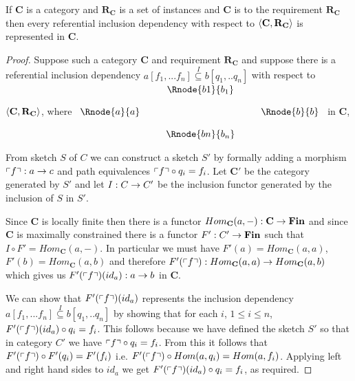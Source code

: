 \documentclass[10pt,a4paper]{article}
\theoremstyle{remark}
\newcommand{\catc}[1][C]{\textbf{#1}}
\newcommand{\catcp}[1][C]{\textbf{#1}'}
\newcommand{\reqt}{\textbf{R}}
\newcommand{\reqtc}[1][\catc]{\reqt_{#1}}
\newcommand{\Fin}{\ensuremath{\textbf{Fin}} }
\begin{document}
\begin{lemma}
\label{catincdsrepresented}
If $\catc$ is a  category and $\reqtc$ is a set of instances  and $\catc$ is 
 to the requirement $\reqtc$ then
every referential inclusion dependency with respect to $\tuple{\catc,\reqtc}$ is represented in $\catc$.
\end{lemma}
\begin{proof}
Suppose such  a category $\catc$ and  requirement $\reqtc$ 
 and suppose there is a referential inclusion dependency
$a[f_1,...f_n] \overset{I}{\subseteq} b[q_1,..q_n]$ with respect to $\tuple{\catc,\reqtc}$,
where
$
\begin{array}{c p{0.25cm} c  p{0.25cm} c }
             &&   \Rnode{b1}{b_1} &&              \\[0.4cm]
\Rnode{a}{a} &&                   && \Rnode{b}{b} \\[0.4cm]
             &&   \Rnode{bn}{b_n} &&              
\end{array} 
$
in $\catc$, 

From sketch $S$ of $C$ we can construct a sketch $S'$ by formally adding a morphism $\left\ulcorner f\right\urcorner: a \rightarrow c$
and path equivalences $\left\ulcorner f\right\urcorner \circ q_i = f_i$. Let $\catcp$ be the category generated by $S'$ and
let $I: C \rightarrow C'$ be the inclusion functor generated by the inclusion of $S$ in $S'$. 

Since $\catc$ is locally finite then there is a functor $Hom_{\catc}(a,-): \catc \morph \Fin$ and since $\catc$ is maximally constrained there is a functor $F': C' \morph \Fin$
such that $I \circ F' = Hom_{\catc}(a,-)$. In particular we must have 
$F'(a)=Hom_{\catc}(a,a)$,
$F'(b)=Hom_{\catc}(a,b)$ and therefore $F'(\qq{f}):Hom_{\catc}(a,a) \morph Hom_{\catc}(a,b)$ which gives us
$F'(\left\ulcorner f\right\urcorner)(id_a): a \rightarrow b$ in $\catc$. 

We can show that $F'(\left\ulcorner f\right\urcorner)(id_a)$ represents
the inclusion dependency $a[f_1,...f_n] \overset{I}{\subseteq} b[q_1,..q_n]$ by showing that for 
each $i$, $1 \leq i \leq n$, $F'(\left\ulcorner f\right\urcorner)(id_a) \circ q_i = f_i$. This follows because we have defined
the sketch $S'$ so that in category $C'$ we have $\left\ulcorner f\right\urcorner \circ q_i = f_i$. From this it follows
that $F'(\left\ulcorner f\right\urcorner) \circ F'(q_i) = F'(f_i)$ i.e. $F'(\left\ulcorner f\right\urcorner) \circ Hom(a,q_i) = Hom(a,f_i)$. Applying left and right hand sides to $id_a$ we get $F'(\left\ulcorner f\right\urcorner)(id_a) \circ q_i = f_i$, as required.
\end{proof}
\end{document}
